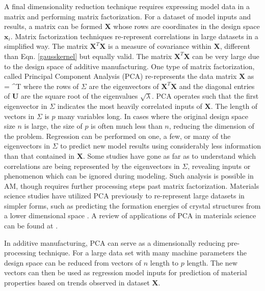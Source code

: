 A final dimensionality reduction technique requires expressing model data in a matrix and performing matrix factorization. For a dataset of model inputs and results, a matrix can be formed $\mathbf{X}$ whose rows are coordinates in the design space $\mathbf{x}_i$. Matrix factorization techniques re-represent correlations in large datasets in a simplified way. The matrix $\mathbf{X}^T\mathbf{X}$ is a measure of covariance within $\mathbf{X}$, different than Eqn. \ref{gausskernel} but equally valid. The matrix $\mathbf{X}^T\mathbf{X}$ can be very large due to the design space of additive manufacturing. One type of matrix factorization, called Principal Component Analysis (PCA) re-represents the data matrix $\mathbf{X}$ as
\eqn
	 =  \mathbf{\Sigma}^T
	\label{PCA}
\equ
where the rows of $\Sigma$ are the eigenvectors of $\mathbf{X}^T\mathbf{X}$ and the diagonal entries of $\mathbf{U}$ are the square root of the eigenvalues $\sqrt{\lambda}$. PCA operates such that the first eigenvector in $\Sigma$ indicates the most heavily correlated inputs of $\mathbf{X}$. The length of vectors in $\Sigma$ is $p$ many variables long. In cases where the original design space size $n$ is large, the size of $p$ is often much less than $n$, reducing the dimension of the problem. Regression can be performed on one, a few, or many of the eigenvectors in $\Sigma$ to predict new model results using considerably less information than that contained in $\mathbf{X}$. Some studies have gone as far as to understand which correlations are being represented by the eigenvectors in $\Sigma$, revealing inputs or phenomenon which can be ignored during modeling. Such analysis is possible in AM, though requires further processing steps past matrix factorization. Materials science studies have utilized PCA previously to re-represent large datasets in simpler forms, such as predicting the formation energies of crystal structures from a lower dimensional space \cite{Curtarolo2003}. A review of applications of PCA in materials science can be found at \cite{Rajan2009}.

In additive manufacturing, PCA can serve as a dimensionally reducing pre-processing technique. For a large data set with many machine parameters the design space can be reduced from vectors of $n$ length to $p$ length. The new vectors can then be used as regression model inputs for prediction of material properties based on trends observed in dataset $\mathbf{X}$.
